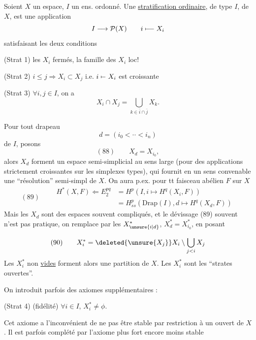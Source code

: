 
Soient $X$ un espace, $I$ un ens. ordonné.
Une \uline{stratification ordinaire}, de type $I$, de $X$, est une application
\[I\longrightarrow\mathcal P(X)\qquad i\mathrel{\mapstochar\relbar\joinrel\relbar}X_i\]
satisfaisant les deux conditions

(Strat 1) les $X_i$ fermés, la famille des $X_i$  loc! 

(Strat 2) $i\leq j\Longrightarrow X_i\subset X_j$ i.e. $i\mathrel{\mapstochar\relbar}X_i$ est croissante

(Strat 3) $\forall i,j\in I$, on a
\[X_i\cap X_j=\bigcup_{k\in\bar i\cap\bar j}X_k.\]

Pour tout drapeau
\[d=(i_0<\cdotp\cdotp<i_n)\]
de $I$, posons
\[(88)\qquad X_d=X_{i_0},\]
alors  $X_d$ forment un  espace semi-simplicial  au sens large (pour des applications strictement croissantes sur les simplexes types), qui fournit en un sens convenable une ``résolution'' semi-simpl de $X$. On aura p.ex. pour tt faisceau abélien $F$ sur $X$
\[
(89)\qquad\begin{aligned}
H^*(X,F)\Longleftarrow E_2^{pq}&=H^p(I,i\mapsto H^q(X_i,F))\\
&=H^p_{ss}(\mathrm{Drap}(I),d\mapsto H^q(X_d,F))
\end{aligned}
\]
Mais les  $X_d$ sont des espaces souvent compliqués, et le dévissage (89) souvent n'est pas pratique, on remplace par les $X_{\unsure{i|d}}^*$, $X_d^*=X_{i_0}^*$, en posant


\[(90)\qquad X_i^*=\deleted{\unsure{X_j}}X_i\setminus\bigcup_{j<i}X_j\]
Les $X_i^*$ non \uline{vides} forment alors une partition de $X$. Les $X_i^*$ sont les ``strates ouvertes''.

On introduit parfois des axiomes supplémentaires :

(Strat 4) (fidélité) $\forall i\in I$, $X_i^*\neq\phi$.

Cet axiome a l'inconvénient de ne pas être stable par  restriction à un ouvert de $X$. Il est parfois complété par l'axiome plus fort encore moins stable

